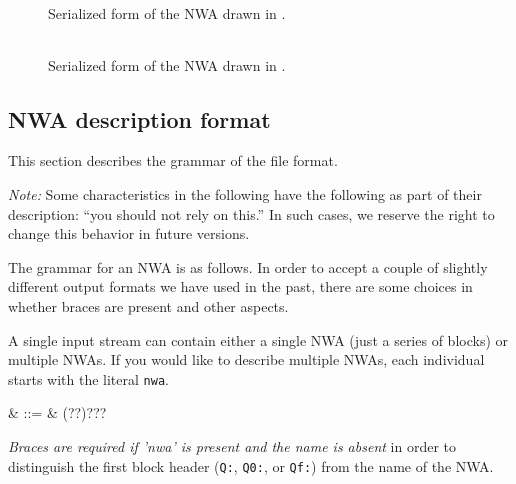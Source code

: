 \begin{figure}
  \centering
  \begin{tabular}{p{2.5in}}
    
  \end{tabular}
  \caption{Serialized form of the NWA drawn in .}
  \label{Fi:nwa-simple}
\end{figure}

\begin{figure}
  \centering
  \begin{tabular}{p{6in}}
    
  \end{tabular}
  \caption{Serialized form of the NWA drawn in .}
  \label{Fi:nwa-mattf}
\end{figure}

\subsection{NWA description format}
\label{Se:nwa-grammar}

This section describes the grammar of the file format.

\emph{Note:} Some characteristics in the following have the
following as part of their description: ``you should not rely on
this.'' In such cases, we reserve the right to change this behavior in
future versions. %



The grammar for an NWA is as follows. In order to accept a couple of
slightly different output formats we have used in the past, there are
some choices in whether braces are present and other aspects.


A single input stream can contain either a single NWA (just a series
of blocks) or multiple NWAs. If you would like to describe multiple
NWAs, each individual starts with the literal \texttt{nwa}.


\begin{grammar}
   & ::= & \left(\cfgsp{}?\cfgsp\term{:}?\right)?\cfgsp\term{\{}?\cfgsp{}\cfgsp\term{\}}?
\end{grammar}

\emph{Braces are required if 'nwa' is present and the name is absent}
 in order to
 distinguish the first block header (\texttt{Q:}, \texttt{Q0:},
 or \texttt{Qf:}) from the name of the NWA.

